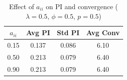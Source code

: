 
\begin{table}[H]
\centering
\small
\begin{tabular}{cccc}
\hline
$a_{ii}$ & Avg PI & Std PI & Avg Conv \\
\hline
0.15 & 0.137 & 0.086 & 6.10 \\
0.50 & 0.213 & 0.079 & 6.40 \\
0.90 & 0.213 & 0.079 & 6.40 \\
\hline
\end{tabular}
\caption{Effect of $a_{ii}$ on PI and convergence ($\lambda=0.5$, $\phi=0.5$, $p=0.5$)}
\end{table}
